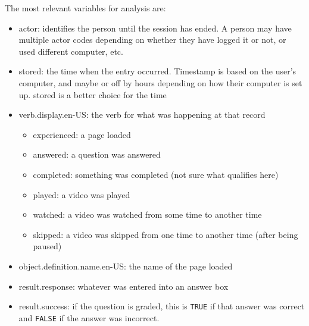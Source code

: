 \documentclass{ximera}
\begin{document}
The most relevant variables for analysis are:
\begin{itemize}
\item actor: identifies the person until the session has ended. A person may have multiple actor codes depending on whether they have logged it or not, or used different computer, etc.
\item stored: the time when the entry occurred. Timestamp is based on the user's computer, and maybe or off by hours depending on how their computer is set up. stored is a better choice for the time
\item verb.display.en-US: the verb for what was happening at that record
\begin{itemize}
\item experienced: a page loaded
\item answered: a question was answered
\item completed: something was completed (not sure what qualifies here)
\item played: a video was played
\item watched: a video was watched from some time to another time
\item skipped: a video was skipped from one time to another time (after being paused)
\end{itemize}
\item object.definition.name.en-US: the name of the page loaded
\item result.response: whatever was entered into an answer box
\item result.success: if the question is graded, this is \verb!TRUE! if that answer was correct and \verb!FALSE! if the answer was incorrect.
\end{itemize}
\end{document}
